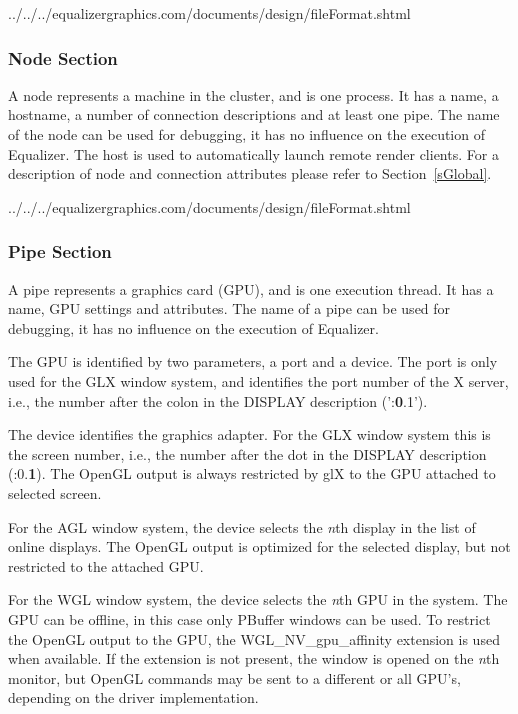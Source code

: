 \documentclass[10pt,a4]{scrartcl}
\newcommand{\sref}[1]{Section~\ref{#1}}
\begin{document}
{\footnotesize
  {../../../equalizergraphics.com/documents/design/fileFormat.shtml}}

\subsubsection{Node Section}

A node represents a machine in the cluster, and is one process. It has a name, a
hostname, a number of connection descriptions and at least one pipe. The name of
the node can be used for debugging, it has no influence on the execution of
Equalizer. The host is used to automatically launch remote render clients. For a
description of node and connection attributes please refer to \sref{sGlobal}.

{\footnotesize
  {../../../equalizergraphics.com/documents/design/fileFormat.shtml}}

\subsubsection{Pipe Section}

A pipe represents a graphics card (GPU), and is one execution thread. It
has a name, GPU settings and attributes. The name of a pipe can be used
for debugging, it has no influence on the execution of Equalizer.

The GPU is identified by two parameters, a port and a device. The port
is only used for the GLX window system, and identifies the port number
of the X server, i.e., the number after the colon in the DISPLAY
description (':\textbf{0}.1').

The device identifies the graphics adapter. For the GLX window system
this is the screen number, i.e., the number after the dot in the DISPLAY
description (:0.\textbf{1}). The OpenGL output is always restricted by
glX to the GPU attached to selected screen.

For the AGL window system, the device selects the \textit{n}th display
in the list of online displays. The OpenGL output is optimized for the
selected display, but not restricted to the attached GPU.

For the WGL window system, the device selects the \textit{n}th GPU in the
system. The GPU can be offline, in this case only PBuffer windows can be
used. To restrict the OpenGL output to the GPU, the
\textsf{WGL\_NV\_gpu\_affinity} extension is used when available. If the
extension is not present, the window is opened on the \textit{n}th monitor, but
OpenGL commands may be sent to a different or all GPU's, depending on the driver
implementation.
\end{document}
